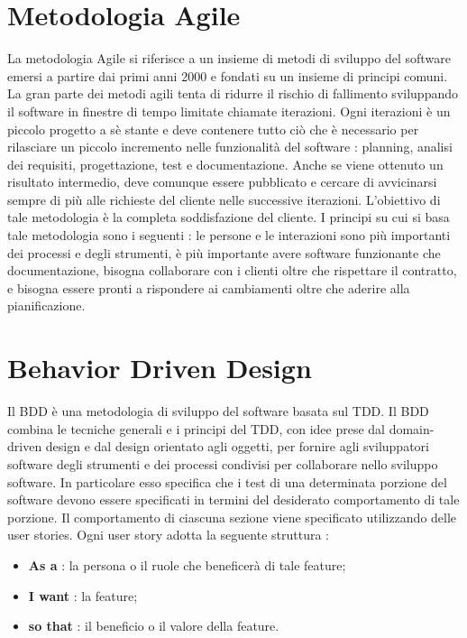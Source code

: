 \documentclass[12pt]{report}
\begin{document}
\section{Metodologia Agile}
La metodologia Agile si riferisce a un insieme di metodi di sviluppo del software emersi a partire dai primi anni 2000 e fondati su un insieme di principi comuni. La gran parte dei metodi agili tenta di ridurre il rischio di fallimento sviluppando il software in finestre di tempo limitate chiamate iterazioni. Ogni iterazioni è un piccolo progetto a sè stante e deve contenere tutto ciò che è necessario per rilasciare un piccolo incremento nelle funzionalità del software : planning, analisi dei requisiti, progettazione, test e documentazione. Anche se viene ottenuto un risultato intermedio, deve comunque essere pubblicato e cercare di avvicinarsi sempre di più alle richieste del cliente nelle successive iterazioni. L'obiettivo di tale metodologia è la completa soddisfazione del cliente. I principi su cui si basa tale metodologia sono i seguenti : le persone e le interazioni sono più importanti dei processi e degli strumenti, è più importante avere software funzionante che documentazione, bisogna collaborare con i clienti oltre che rispettare il contratto, e bisogna essere pronti a rispondere ai cambiamenti oltre che aderire alla pianificazione.
\section{Behavior Driven Design}
Il BDD è una metodologia di sviluppo del software basata sul TDD. Il BDD combina le tecniche generali e i principi del TDD, con idee prese dal domain-driven design e dal design orientato agli oggetti, per fornire agli sviluppatori software degli strumenti e dei processi condivisi per collaborare nello sviluppo software. In particolare esso specifica che i test di una determinata porzione del software devono essere specificati in termini del desiderato comportamento di tale porzione. Il comportamento di ciascuna sezione viene specificato utilizzando delle user stories. Ogni user story adotta la seguente struttura :
\begin{itemize}
\item \textbf{As a} : la persona o il ruole che beneficerà di tale feature;
\item \textbf{I want} : la feature;
\item \textbf{so that} : il beneficio o il valore della feature.
\end{itemize}
\end{document}
